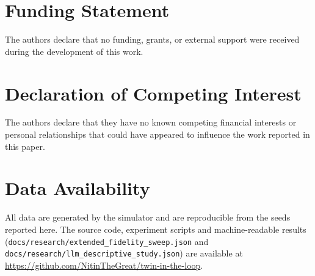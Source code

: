 \documentclass[conference]{IEEEtran}
\begin{document}
\section*{Funding Statement}
The authors declare that no funding, grants, or external support were received during the development of this work.

\section*{Declaration of Competing Interest}
The authors declare that they have no known competing financial interests or personal relationships that could have appeared to influence the work reported in this paper.

\section*{Data Availability}
All data are generated by the simulator and are reproducible from the seeds reported here. The source code, experiment scripts and machine-readable results (\texttt{docs/research/extended\_fidelity\_sweep.json} and \texttt{docs/research/llm\_descriptive\_study.json}) are available at \url{https://github.com/NitinTheGreat/twin-in-the-loop}.
\end{document}
